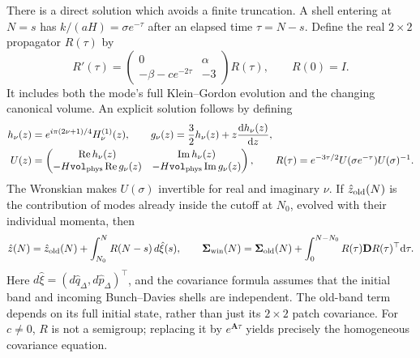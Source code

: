 \documentclass{article}
\newcommand{\Vphys}{\mathtt{vol}_{\rm phys}}
\numberwithin{equation}{section}
\begin{document}
There is a direct solution which avoids a finite truncation. A shell entering at $N=s$ has $k/(aH)=\sigma e^{-\tau}$ after an elapsed time $\tau=N-s$. Define the real $2\times2$ propagator $R(\tau)$ by
\begin{equation}
 R'(\tau)=
 \begin{pmatrix}0&\alpha\\-\beta-c e^{-2\tau}&-3\end{pmatrix}R(\tau),
 \qquad R(0)=I.
 \label{eq:shellAgePropagator}
\end{equation}
It includes both the mode's full Klein--Gordon evolution and the changing canonical volume. An explicit solution follows by defining
\begin{subequations}\label{eq:explicitShellPropagator}
\begin{align}
 h_\nu(z)&=e^{i\pi(2\nu+1)/4}H_\nu^{(1)}(z),\qquad
 g_\nu(z)=\frac32h_\nu(z)+z\frac{\dd h_\nu(z)}{\dd z},\\
 U(z)&=\begin{pmatrix}
 \operatorname{Re}h_\nu(z)&\operatorname{Im}h_\nu(z)\\
 -H\Vphys\operatorname{Re}g_\nu(z)&-H\Vphys\operatorname{Im}g_\nu(z)
 \end{pmatrix},\qquad
 R(\tau)=e^{-3\tau/2}U(\sigma e^{-\tau})U(\sigma)^{-1}.
\end{align}
\end{subequations}
The Wronskian makes $U(\sigma)$ invertible for real and imaginary $\nu$. If $\hat z_{\rm old}(N)$ is the contribution of modes already inside the cutoff at $N_0$, evolved with their individual momenta, then
\begin{equation}
 \hat z(N)=\hat z_{\rm old}(N)+\int_{N_0}^N R(N-s)\,d\hat\xi(s),\qquad
 \mathbf\Sigma_{\rm win}(N)=\mathbf\Sigma_{\rm old}(N)+
 \int_0^{N-N_0}R(\tau)\mathbf D R(\tau)^\top\dd\tau.
 \label{eq:exactShellCovariance}
\end{equation}
Here $d\hat\xi=(d\hat q_\Delta,d\hat p_\Delta)^\top$, and the covariance formula assumes that the initial band and incoming Bunch--Davies shells are independent. The old-band term depends on its full initial state, rather than just its $2\times2$ patch covariance. For $c\neq0$, $R$ is not a semigroup; replacing it by $e^{\mathbf A\tau}$ yields precisely the homogeneous covariance equation.
\end{document}
